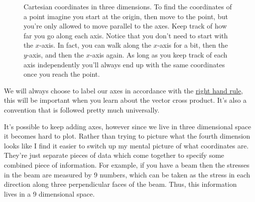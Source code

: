 \documentclass[fleqn]{LectureClass/LectureClass}
\begin{document}
    \begin{figure}
        \centering
        \caption[Cartesian coordinates in three dimensions.]{Cartesian coordinates in three dimensions. To find the coordinates of a point imagine you start at the origin, then move to the point, but you're only allowed to move parallel to the axes. Keep track of how far you go along each axis. Notice that you don't need to start with the \(x\)-axis. In fact, you can walk along the \(x\)-axis for a bit, then the \(y\)-axis, and then the \(x\)-axis again. As long as you keep track of each axis independently you'll always end up with the same coordinates once you reach the point.}
        \label{fig:cartesian coordinates 3d}
    \end{figure}
     
    \begin{remark}{}{}
        We will always choose to label our axes in accordance with the \href{https://en.wikipedia.org/wiki/Right-hand_rule#Coordinates}{right hand rule}, this will be important when you learn about the vector cross product.
        It's also a convention that is followed pretty much universally.
    \end{remark}
     
    It's possible to keep adding axes, however since we live in three dimensional space it becomes hard to plot.
    Rather than trying to picture what the fourth dimension looks like I find it easier to switch up my mental picture of what coordinates are.
    They're just separate pieces of data which come together to specify some combined piece of information.
    For example, if you have a beam then the stresses in the beam are measured by \(9\) numbers, which can be taken as the stress in each direction along three perpendicular faces of the beam.
    Thus, this information lives in a 9 dimensional space.
     
\end{document}

